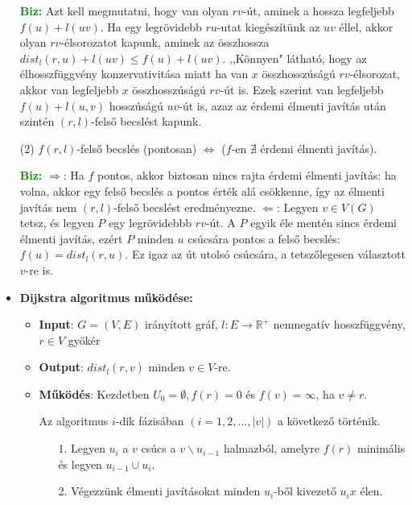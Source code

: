 \documentclass[../../szobeli.tex]{subfiles}
\begin{document}
\begin{itemize}
            \textbf{\textcolor{green}{Biz:}} Azt kell megmutatni, hogy van  olyan $rv$-út, aminek a hossza legfeljebb $f(u) + l(uv)$. Ha egy legrövidebb $ru$-utat kiegészítünk az $uv$ éllel, akkor olyan $rv$-élsorozatot kapunk, aminek az összhossza $dist_l (r,u) + l(uv) \leq f(u) + l(uv)$. ,,Könnyen" látható, hogy  az élhosszfüggvény konzervativitása miatt ha van $x$ összhosszúságú $rv$-élsorozat, akkor van legfeljebb $x$ összhosszúságú $rv$-út is. Ezek szerint van legfeljebb $f(u) + l(u,v)$ hosszúságú $uv$-út is, azaz az érdemi élmenti javítás után szintén $(r,l)$-felső becslést kapunk.    

            (2) $f (r,l)$-felső becslés (pontosan) $\Longleftrightarrow$ ($f$-en $\nexists$ érdemi élmenti javítás).

            \textcolor{green}{\textbf{Biz:}}  $\Rightarrow$: Ha $f$ pontos, akkor biztosan nincs rajta érdemi élmenti javítás: ha volna, akkor egy felső becslés a pontos érték alá csökkenne, így az élmenti javítás nem  $(r,l)$-felső becslést eredményezne. $\Leftarrow$: Legyen $v \in V(G)$ tetsz, és legyen $P$ egy legrövidebbb $rv$-út. A $P$ egyik éle mentén sincs érdemi élmenti javítás, ezért $P$ minden $u$ csúcsára pontos a felső becslés: $f(u) = dist_l(r,u)$. Ez igaz az út utolsó csúcsára, a tetszőlegesen választott $v$-re is.  
            
        \item \textbf{Dijkstra algoritmus működése:} \begin{itemize}
        
            \item \textbf{Input}: $G=(V,E)$ irányított gráf, $l:E\rightarrow \mathbb{R}^+$ nemnegatív hosszfüggvény, $r \in V$ gyökér
            \item \textbf{Output}: $dist_l(r,v)$ minden $v \in V$-re.
            \item \textbf{Működés}: Kezdetben $U_0 = \emptyset, f(r) = 0$ és $f(v) = \infty$, ha $v \neq r$. 
            
            Az algoritmus $i$-dik fázisában $(i=1,2,..., |v|)$ a következő történik. \begin{itemize}
                \item[1.] Legyen $u_i$ a $v$ csúcs a $v\backslash u_{i-1}$ halmazból, amelyre $f(r)$ minimális és legyen $u_{i-1} \cup {u_i}$.
                \item[2.] Végezzünk élmenti javításokat minden $u_i$-ből kivezető $u_ix$ élen.
            \end{itemize}
            

\end{itemize}
\end{itemize}
\end{document}
